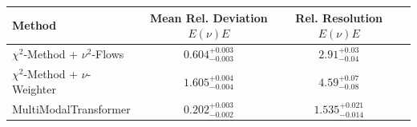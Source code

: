     \begin{tabular}{lccc}
        \toprule
        Method & Mean Rel. Deviation $E(\nu)E$ & Rel. Resolution $E(\nu)E$ \\
        \midrule
        $\chi^2$-Method + $\nu^2$-Flows & $0.604^{+0.003}_{-0.003}$ & $2.91^{+0.03}_{-0.04}$ \\
        $\chi^2$-Method + $\nu$-Weighter & $1.605^{+0.004}_{-0.004}$ & $4.59^{+0.07}_{-0.08}$ \\
        MultiModalTransformer & $0.202^{+0.003}_{-0.002}$ & $1.535^{+0.021}_{-0.014}$ \\
        \bottomrule
    \end{tabular}